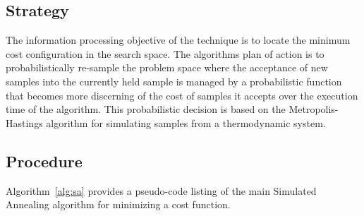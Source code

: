 \subsection{Strategy}
The information processing objective of the technique is to locate the minimum cost configuration in the search space.
The algorithms plan of action is to probabilistically re-sample the problem space where the acceptance of new samples into the currently held sample is managed by a probabilistic function that becomes more discerning of the cost of samples it accepts over the execution time of the algorithm. This probabilistic decision is based on the Metropolis-Hastings algorithm for simulating samples from a thermodynamic system.

\subsection{Procedure}
Algorithm~\ref{alg:sa} provides a pseudo-code listing of the main Simulated Annealing algorithm for minimizing a cost function.

